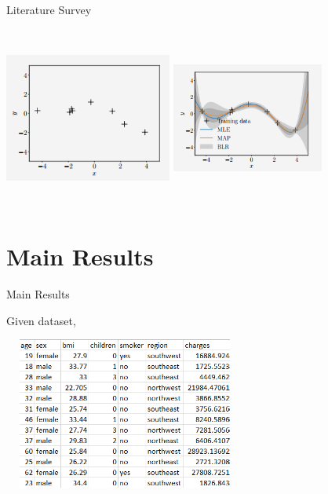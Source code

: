 \documentclass[handout,9pt]{beamer}
\numberwithin{theorem}{section}
\begin{document}
\begin{frame}{Literature Survey}
	\begin{spacing}{1}
		\begin{center}
			\includegraphics[height=6cm, width=5.5cm]{graph17}
			\includegraphics[height=6cm, width=5cm]{graph18}
		\end{center}
		\end{spacing}
\end{frame}

\section{Main Results}
\begin{frame}{Main Results}
	\begin{spacing}{1}
		Given dataset,
		\begin{center}
			\includegraphics[height=5cm, width=8cm]{slide2}
		\end{center}
		
	\end{spacing}
\end{frame}
\end{document}
